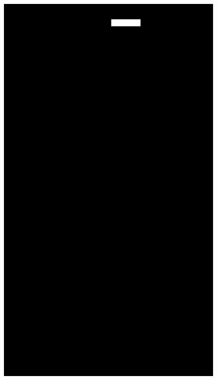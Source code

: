 \begin{figure}[!htbp]
    \centering
        \begin{minipage}{\sizeImg\textwidth}
            \includegraphics[width=\textwidth]{figuras/ultrapassar_barra/134_mask_head.png}
        \end{minipage}
        \begin{minipage}{\sizeImg\textwidth}

\end{minipage}
\end{figure}
